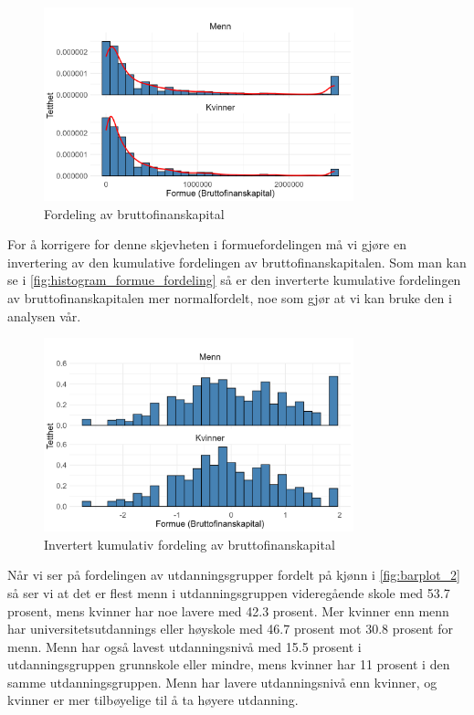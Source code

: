 \documentclass[
  12pt,
  a4paper,
  DIV=11,
  numbers=noendperiod]{scrartcl}
\begin{document}
\vspace{-0.5cm}
\begin{figure}[H]
\caption{Fordeling av bruttofinanskapital}
\label{fig:histogram_formue}
\centering
\includegraphics[width=0.8\textwidth]{dokumentobjekter/figurer/fig_4_1.png}
\end{figure}

For å korrigere for denne skjevheten i formuefordelingen må vi gjøre en
invertering av den kumulative fordelingen av bruttofinanskapitalen. Som
man kan se i \autoref{fig:histogram_formue_fordeling} så er den
inverterte kumulative fordelingen av bruttofinanskapitalen mer
normalfordelt, noe som gjør at vi kan bruke den i analysen vår.

\vspace{-0.75cm}
\begin{figure}[H]
\caption{Invertert kumulativ fordeling av bruttofinanskapital}
\label{fig:histogram_formue_fordeling}
\centering
\includegraphics[width=0.8\textwidth]{dokumentobjekter/figurer/fig_4_2.png}
\end{figure}
\vspace{-0.75cm}

Når vi ser på fordelingen av utdanningsgrupper fordelt på kjønn i
\autoref{fig:barplot_2} så ser vi at det er flest menn i
utdanningsgruppen videregående skole med 53.7 prosent, mens kvinner har
noe lavere med 42.3 prosent. Mer kvinner enn menn har
universitetsutdannings eller høyskole med 46.7 prosent mot 30.8 prosent
for menn. Menn har også lavest utdanningsnivå med 15.5 prosent i
utdanningsgruppen grunnskole eller mindre, mens kvinner har 11 prosent i
den samme utdanningsgruppen. Menn har lavere utdanningsnivå enn kvinner,
og kvinner er mer tilbøyelige til å ta høyere utdanning.
\end{document}
